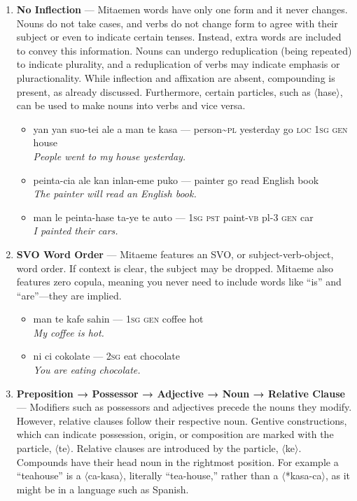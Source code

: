 \documentclass[a4paper, titlepage]{article}
\begin{document}
\begin{enumerate}
	\item \textbf{No Inflection} — Mitaemen words have only one form and it never changes. Nouns do not take cases, and verbs do not change form to agree with their subject or even to indicate certain tenses. Instead, extra words are included to convey this information. Nouns can undergo reduplication (being repeated) to indicate plurality, and a reduplication of verbs may indicate emphasis or pluractionality. While inflection and affixation are absent, compounding is present, as already discussed.  Furthermore, certain particles, such as $\langle$hase$\rangle$, can be used to make nouns into verbs and vice versa.
	\begin{itemize}
		\item yan yan suo-tei ale a man te kasa — person\textasciitilde{}\textsc{pl} yesterday go \textsc{loc 1sg gen} house\\\textit{People went to my house yesterday.}
		\item peinta-cia ale kan inlan-eme puko — painter go read English book\\\textit{The painter will read an English book.}
		\item man le peinta-hase ta-ye te auto — \textsc{1sg pst} paint-\textsc{vb} pl-3 \textsc{gen} car \\\textit{I painted their cars.}
	\end{itemize}
	\item \textbf{SVO Word Order} — Mitaeme features an SVO, or subject-verb-object, word order. If context is clear, the subject may be dropped. Mitaeme also features zero copula, meaning you never need to include words like ``is'' and ``are''—they are implied.
	\begin{itemize}
		\item man te kafe sahin — \textsc{1sg} \textsc{gen} coffee hot\\\textit{My coffee is hot.}
		\item ni ci cokolate — \textsc{2sg} eat chocolate\\\textit{You are eating chocolate.}
	\end{itemize}
	\item \textbf{ Preposition → Possessor → Adjective → Noun → Relative Clause  } — Modifiers such as possessors and adjectives precede the nouns they modify. However, relative clauses follow their respective noun. Gentive constructions, which can indicate possession, origin, or composition are marked with the particle, $\langle$te$\rangle$. Relative clauses are introduced by the particle, $\langle$ke$\rangle$. Compounds have their head noun in the rightmost position. For example a ``teahouse'' is a $\langle$ca-kasa$\rangle$, literally ``tea-house,'' rather than a $\langle$*kasa-ca$\rangle$, as it might be in a language such as Spanish.

\end{enumerate}
\end{document}
